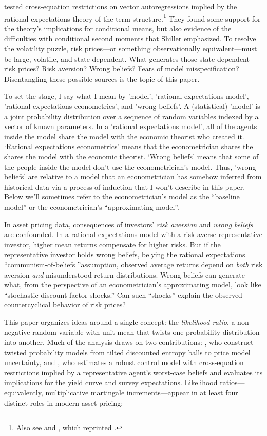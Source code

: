 \documentclass[12pt]{article}
\theoremstyle{definition}
\begin{document}
\citet{hansen1981exact} tested cross-equation restrictions on vector autoregressions implied by the rational expectations theory of the term structure.\footnote{Also see \citet{Sargent1972,Sargent1979} and \citet{HansenSargent1991}, which
reprinted \citet{hansen1981exact}.} They found some support for the theory's implications for conditional means, but also evidence of the difficulties with conditional second moments that Shiller emphasized. To resolve the volatility puzzle, risk prices---or something observationally equivalent---must be large, volatile, and state-dependent. What generates those state-dependent risk prices? Risk aversion? Wrong beliefs? Fears of model misspecification? Disentangling these possible sources is the topic of this paper.

To set the stage, I say what I mean by 'model', 'rational expectations model', 'rational expectations econometrics',  and 'wrong beliefs'.  A (statistical)  'model' is  a joint probability distribution over a sequence of random variables indexed by a  vector of known parameters. In a  'rational expectations model', all of the agents inside the model share the model with the economic theorist who created it.   `Rational expectations econometrics'  means that the econometrician shares the shares the model with the economic theorist.   `Wrong beliefs'  means that some of the people  inside the  model  don't use  the econometrician's model. Thus, 'wrong beliefs' are relative to a  model that an econometrician has somehow inferred from historical data via a process of induction that I won't describe in this paper.  Below we'll sometimes refer to the econometrician's model  as the ``baseline model'' or the econometrician's ``approximating model''.

In asset pricing data, consequences  of investors' \emph{risk aversion} and \emph{wrong beliefs} are
confounded.  In a rational expectations model with a
risk-averse representative investor, higher mean returns compensate for
higher risks.  But if the representative investor holds wrong beliefs, belying the  rational expectations ``communism-of-beliefs ''assumption,
observed average returns depend on \emph{both} risk aversion \emph{and}
misunderstood return distributions.  Wrong beliefs can generate what, from the perspective of an econometrician's approximating model, look
like ``stochastic discount factor shocks.'' Can such ``shocks'' explain the observed countercyclical behavior of risk prices?


This paper organizes ideas around a single concept: the
\emph{likelihood ratio}, a non-negative random variable with unit mean
that twists one probability distribution into another.
Much of the analysis draws on two contributions:
\citet{HSHS2020}, who construct
twisted probability models from tilted discounted entropy balls to
price model uncertainty, and \citet{Szoke2022}, who estimates a
robust control model with cross-equation restrictions implied by a
representative agent's worst-case beliefs and evaluates its
implications for the yield curve and survey expectations.
Likelihood
ratios---equivalently, multiplicative martingale increments---appear in
at least four distinct roles in modern asset pricing:
\end{document}
